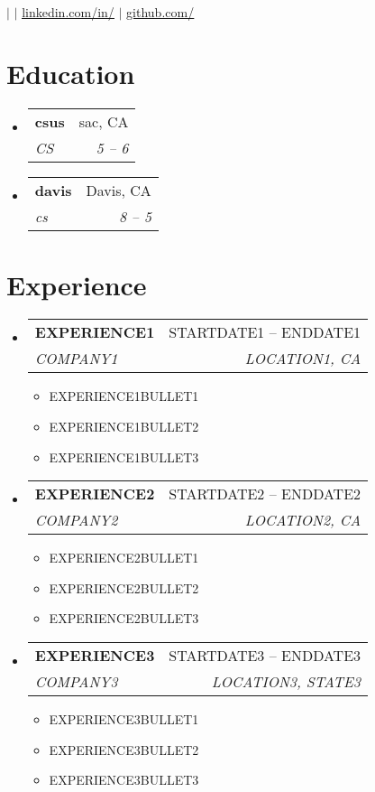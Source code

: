 \documentclass[letterpaper,11pt]{article}
\makeatletter
\newcommand{\resumeItem}[1]{
  \item\small{
    {#1 \vspace{-2pt}}
  }
}
\newcommand{\resumeSubheading}[4]{
  \vspace{-2pt}\item
    \begin{tabular*}{0.97\textwidth}[t]{l@{\extracolsep{\fill}}r}
      \textbf{#1} & #2 \\
      \textit{\small#3} & \textit{\small #4} \\
    \end{tabular*}\vspace{-7pt}
}
\newcommand{\resumeSubSubheading}[2]{
    \item
    \begin{tabular*}{0.97\textwidth}{l@{\extracolsep{\fill}}r}
      \textit{\small#1} & \textit{\small #2} \\
    \end{tabular*}\vspace{-7pt}
}
\newcommand{\resumeSubHeadingListStart}{\begin{itemize}[leftmargin=0.15in, label={}]}
\newcommand{\resumeSubHeadingListEnd}{\end{itemize}}
\newcommand{\resumeItemListStart}{\begin{itemize}}
\newcommand{\resumeItemListEnd}{\end{itemize}\vspace{-5pt}}
\makeatother
\begin{document}
\begin{center}
    \textbf{\Huge \scshape } \\ \vspace{1pt}
    \small  $|$ \href{mailto:x@x.com}{\underline{}} $|$ 
    \href{https://linkedin.com/in/...}{\underline{linkedin.com/in/}} $|$
    \href{https://github.com/...}{\underline{github.com/}}
\end{center}
\section{Education}
  \resumeSubHeadingListStart
    \resumeSubheading
      {csus}{sac, CA}
      {CS}{5 -- 6}
    \resumeSubheading
      {davis}{Davis, CA}
      {cs}{8 -- 5}
  \resumeSubHeadingListEnd
\section{Experience}
  \resumeSubHeadingListStart
    \resumeSubheading
      {EXPERIENCE1}{STARTDATE1 -- ENDDATE1}
      {COMPANY1}{LOCATION1, CA}
      \resumeItemListStart
        \resumeItem{EXPERIENCE1BULLET1}
        \resumeItem{EXPERIENCE1BULLET2}
        \resumeItem{EXPERIENCE1BULLET3}
      \resumeItemListEnd
    \resumeSubheading
      {EXPERIENCE2}{STARTDATE2 -- ENDDATE2}
      {COMPANY2}{LOCATION2, CA}
      \resumeItemListStart
        \resumeItem{EXPERIENCE2BULLET1}
        \resumeItem{EXPERIENCE2BULLET2}
        \resumeItem{EXPERIENCE2BULLET3}
      \resumeItemListEnd
    \resumeSubheading
      {EXPERIENCE3}{STARTDATE3 -- ENDDATE3}
      {COMPANY3}{LOCATION3, STATE3}
      \resumeItemListStart
        \resumeItem{EXPERIENCE3BULLET1}
        \resumeItem{EXPERIENCE3BULLET2}
        \resumeItem{EXPERIENCE3BULLET3}
      \resumeItemListEnd
  \resumeSubHeadingListEnd
\end{document}

